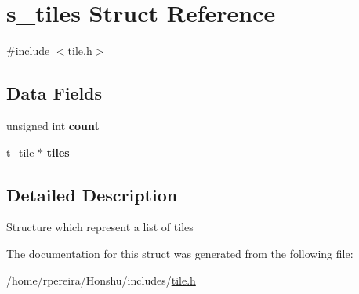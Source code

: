 \hypertarget{structs__tiles}{}\section{s\+\_\+tiles Struct Reference}
\label{structs__tiles}


{\ttfamily \#include $<$tile.\+h$>$}

\subsection*{Data Fields}
\begin{DoxyCompactItemize}
\item 
unsigned int {\bfseries count}\hypertarget{structs__tiles_a1be36b04b6b1ad88850a42164aa2bc2a}{}\label{structs__tiles_a1be36b04b6b1ad88850a42164aa2bc2a}

\item 
\hyperlink{structs__tile}{t\+\_\+tile} $\ast$ {\bfseries tiles}\hypertarget{structs__tiles_abc80e56076378f1b1119262e4be31d06}{}\label{structs__tiles_abc80e56076378f1b1119262e4be31d06}

\end{DoxyCompactItemize}


\subsection{Detailed Description}
Structure which represent a list of tiles 

The documentation for this struct was generated from the following file\+:\begin{DoxyCompactItemize}
\item 
/home/rpereira/\+Honshu/includes/\hyperlink{tile_8h}{tile.\+h}\end{DoxyCompactItemize}
